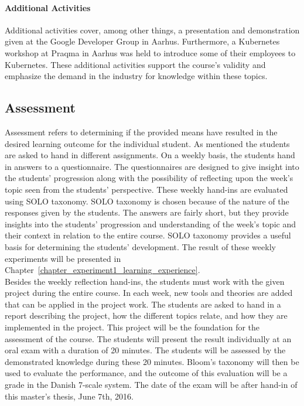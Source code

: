 \paragraph{Additional Activities}
Additional activities cover, among other things, a presentation and demonstration given at the Google Developer Group in Aarhus. Furthermore, a Kubernetes workshop at Praqma in Aarhus was held to introduce some of their employees to Kubernetes. These additional activities support the course's validity and emphasize the demand in the industry for knowledge within these topics.

\subsection*{Assessment}
Assessment refers to determining if the provided means have resulted in the desired learning outcome for the individual student. As mentioned the students are asked to hand in different assignments. On a weekly basis, the students hand in answers to a questionnaire. The questionnaires are designed to give insight into the students' progression along with the possibility of reflecting upon the week's topic seen from the students' perspective. These weekly hand-ins are evaluated using SOLO taxonomy. SOLO taxonomy is chosen because of the nature of the responses given by the students. The answers are fairly short, but they provide insights into the students' progression and understanding of the week's topic and their context in relation to the entire course. SOLO taxonomy provides a useful basis for determining the students' development. The result of these weekly experiments will be presented in Chapter~\ref{chapter_experiment1_learning_experience}.\\

\noindent 
Besides the weekly reflection hand-ins, the students must work with the given project during the entire course. In each week, new tools and theories are added that can be applied in the project work. The students are asked to hand in a report describing the project, how the different topics relate, and how they are implemented in the project. This project will be the foundation for the assessment of the course. The students will present the result individually at an oral exam with a duration of 20 minutes. The students will be assessed by the demonstrated knowledge during these 20 minutes. Bloom's taxonomy will then be used to evaluate the performance, and the outcome of this evaluation will be a grade in the Danish 7-scale system. The date of the exam will be after hand-in of this master's thesis, June 7th, 2016. 

